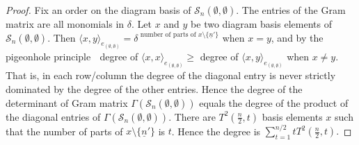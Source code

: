 \documentclass[10pt,a4paper]{amsart}
\newcommand{\Gram}{\Gamma}
\newcommand{\T}{T^2}  %
\newcommand{\cell}{\mathcal{S}}
\newcommand{\nk}{n}  %
\newcommand{\ppmm}[1]{{#1}}
\newcommand{\spine}{\mathcal{S}_n(\emptyset,\emptyset)}
\begin{document}
\begin{proof}
Fix an order on the diagram basis of $\cell_\nk(\emptyset,\emptyset)$.  
The entries of the Gram matrix are all monomials in $\delta$. 
Let $x$ and $y$ be two diagram basis 
\ppmm{elements}
of $\spine$. Then  
$\langle x, y\rangle_{e_{(\emptyset,\emptyset)}}
 = \delta^{\text{ number of parts of }x\setminus \{\underline{n}'\}} $ 
 when $x=y$, and by the pigeonhole principle 
$\;$ degree of $\langle x, x\rangle_{e_{(\emptyset,\emptyset)}}\geq$ degree of $ \langle x, y\rangle_{e_{(\emptyset,\emptyset)}}$ 
when $x\neq y$. 
That is, in each row/column the degree of the diagonal entry is never strictly dominated by the degree of the other entries. 
Hence the degree of 
 the determinant of Gram matrix 
 $\Gram(\spine)$   %
 equals the 
 degree of the product of the diagonal entries of 
 $\Gram(\spine).$ 
 There are $\T(\frac{\nk}{2}, t)$ basis 
 {elements}
 $x$ such that the number of parts of $x\setminus \{\underline{\nk}'\}$ is $t$. 
 Hence the degree  %
 is 
$
\sum_{t=1}^{\nk/2} t \T(\frac{\nk}{2}, t).
$
\end{proof}
\end{document}
